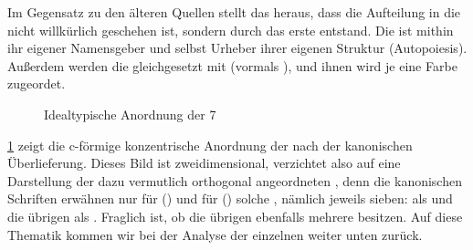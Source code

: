 Im Gegensatz zu den älteren Quellen stellt das  heraus, dass die Aufteilung in die  nicht willkürlich geschehen ist, sondern durch das erste  entstand. Die  ist mithin ihr eigener Namensgeber und selbst Urheber ihrer eigenen Struktur (Autopoiesis). Außerdem werden die  gleichgesetzt mit  (vormals ), und ihnen wird je eine Farbe zugeordet.

\begin{figure}[ht!]
    \centering
    
    \caption{Idealtypische Anordnung der 7 }
    \label{fig:ringconvention}
\end{figure}

\cref{fig:ringconvention} zeigt die c-förmige konzentrische Anordnung der  nach der kanonischen Überlieferung. Dieses Bild ist zweidimensional, verzichtet also auf eine Darstellung der dazu vermutlich orthogonal angeordneten , denn die kanonischen Schriften erwähnen nur für  () und für  () solche , nämlich jeweils sieben:  als  und die übrigen als  \cite{cbasestarbasemanual}. Fraglich ist, ob die übrigen  ebenfalls mehrere  besitzen. Auf diese Thematik kommen wir bei der Analyse der einzelnen  weiter unten zurück.
        
